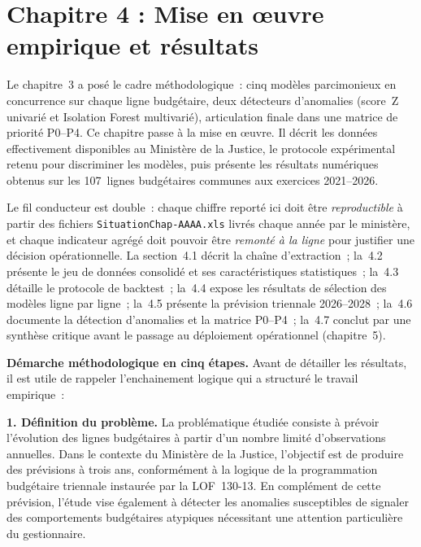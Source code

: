 \section*{Chapitre 4 : Mise en \oe{}uvre empirique et r\'esultats}

\bigskip

Le chapitre~3 a pos\'e le cadre m\'ethodologique~: cinq mod\`eles parcimonieux
en concurrence sur chaque ligne budg\'etaire, deux d\'etecteurs d'anomalies
(score~Z univari\'e et Isolation Forest multivari\'e), articulation finale
dans une matrice de priorit\'e P0--P4. Ce chapitre passe \`a la mise en
\oe{}uvre. Il d\'ecrit les donn\'ees effectivement disponibles au Minist\`ere
de la Justice, le protocole exp\'erimental retenu pour discriminer les
mod\`eles, puis pr\'esente les r\'esultats num\'eriques obtenus sur les
107~lignes budg\'etaires communes aux exercices 2021--2026.

Le fil conducteur est double~: chaque chiffre report\'e ici doit \^etre
\emph{reproductible} \`a partir des fichiers \texttt{SituationChap-AAAA.xls}
livr\'es chaque ann\'ee par le minist\`ere, et chaque indicateur agr\'eg\'e
doit pouvoir \^etre \emph{remont\'e \`a la ligne} pour justifier une d\'ecision
op\'erationnelle. La section~4.1 d\'ecrit la cha\^ine d'extraction~; la~4.2
pr\'esente le jeu de donn\'ees consolid\'e et ses caract\'eristiques
statistiques~; la~4.3 d\'etaille le protocole de backtest~; la~4.4 expose
les r\'esultats de s\'election des mod\`eles ligne par ligne~; la~4.5
pr\'esente la pr\'evision triennale 2026--2028~; la~4.6 documente la
d\'etection d'anomalies et la matrice P0--P4~; la~4.7 conclut par une
synth\`ese critique avant le passage au d\'eploiement op\'erationnel
(chapitre~5).

\bigskip

\noindent\textbf{D\'emarche m\'ethodologique en cinq \'etapes.} Avant de
d\'etailler les r\'esultats, il est utile de rappeler l'enchainement logique
qui a structur\'e le travail empirique~:

\medskip

\noindent\textbf{1. D\'efinition du probl\`eme.} La probl\'ematique \'etudi\'ee
consiste \`a pr\'evoir l'\'evolution des lignes budg\'etaires \`a partir d'un
nombre limit\'e d'observations annuelles. Dans le contexte du Minist\`ere de la
Justice, l'objectif est de produire des pr\'evisions \`a trois ans, conform\'ement
\`a la logique de la programmation budg\'etaire triennale instaur\'ee par la
LOF~130-13. En compl\'ement de cette pr\'evision, l'\'etude vise \'egalement \`a
d\'etecter les anomalies susceptibles de signaler des comportements
budg\'etaires atypiques n\'ecessitant une attention particuli\`ere du
gestionnaire.

